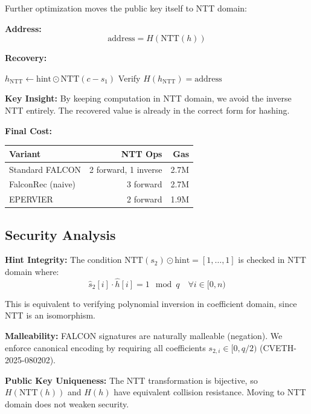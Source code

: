 Further optimization moves the public key itself to NTT domain:

\textbf{Address:}
\begin{equation}
\text{address} = H(\text{NTT}(h))
\end{equation}

\textbf{Recovery:}
\begin{algorithmic}[1]
\STATE $h_{\text{NTT}} \gets \text{hint} \odot \text{NTT}(c - s_1)$
\STATE Verify $H(h_{\text{NTT}}) = \text{address}$
\end{algorithmic}

\textbf{Key Insight:} By keeping computation in NTT domain, we avoid the inverse NTT entirely. The recovered value is already in the correct form for hashing.

\textbf{Final Cost:}
\begin{center}
\begin{tabular}{lrr}
\hline
\textbf{Variant} & \textbf{NTT Ops} & \textbf{Gas} \\
\hline
Standard FALCON & 2 forward, 1 inverse & 2.7M \\
FalconRec (naive) & 3 forward & 2.7M \\
EPERVIER & 2 forward & 1.9M \\
\hline
\end{tabular}
\end{center}

\subsection{Security Analysis}

\textbf{Hint Integrity:} The condition $\text{NTT}(s_2) \odot \text{hint} = [1, \ldots, 1]$ is checked in NTT domain where:
\begin{equation}
\hat{s}_2[i] \cdot \hat{h}[i] = 1 \mod q \quad \forall i \in [0, n)
\end{equation}

This is equivalent to verifying polynomial inversion in coefficient domain, since NTT is an isomorphism.

\textbf{Malleability:} FALCON signatures are naturally malleable (negation). We enforce canonical encoding by requiring all coefficients $s_{2,i} \in [0, q/2)$ (CVETH-2025-080202).

\textbf{Public Key Uniqueness:} The NTT transformation is bijective, so $H(\text{NTT}(h))$ and $H(h)$ have equivalent collision resistance. Moving to NTT domain does not weaken security.

